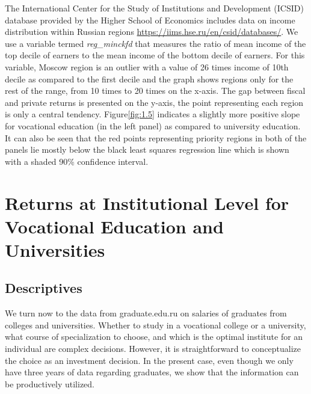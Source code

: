 \documentclass[alpha-refs]{wiley-article-05g}
\begin{document}
The  International Center for the Study of Institutions and Development (ICSID) database provided by the Higher School of Economics includes data on income distribution within Russian regions \url{https://iims.hse.ru/en/csid/databases/}. We use a variable termed \textit{reg\_minckfd} that measures the ratio of mean income of the top decile of earners to the mean income of the bottom decile of earners. For this variable, Moscow region is an outlier with a value of 26 times income of 10th decile as compared to the first decile and the graph shows regions only for the rest of the range, from 10 times to 20 times on the x-axis. The gap between fiscal and private returns is presented on the y-axis, the point representing each region is only a central tendency. Figure\ref{fig:1.5} indicates a slightly more positive slope for vocational education (in the left panel) as compared to university education. It can also be seen that the red points representing priority regions in both of the panels lie mostly below the black least squares regression line which is shown with a shaded 90\% confidence interval.

\vspace{-2em}

\section{Returns at Institutional Level for Vocational Education and Universities} 

\subsection{Descriptives}

We turn now to the data from graduate.edu.ru on salaries of graduates from colleges and universities. Whether to study in a vocational college or a university, what course of specialization to choose, and which is the optimal institute for an individual are complex decisions. However, it is straightforward to conceptualize the choice as an investment decision. In the present case, even though we only have three years of data regarding graduates, we show that the information can be productively utilized. 
\end{document}
